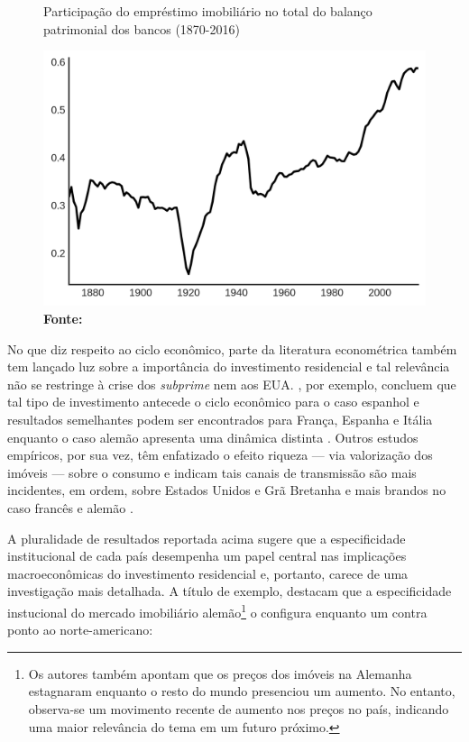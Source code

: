 \begin{figure}
	\centering
	\caption{Participação do empréstimo imobiliário no total do balanço patrimonial dos bancos (1870-2016)}
	\label{GraficoJorda}
	\includegraphics[width=.65\textwidth]{Jorda_Mean.png}
	\caption*{\textbf{Fonte:} \textcite[p.~10]{jorda_great_2014}}
\end{figure}



No que diz respeito ao ciclo econômico, parte da literatura econométrica também tem lançado luz sobre a importância do investimento residencial e tal relevância não se restringe à crise dos \textit{subprime} nem aos EUA. \textcite{alvarez_does_2010}, por exemplo, concluem que tal tipo de investimento antecede o ciclo econômico para o caso espanhol e resultados semelhantes podem ser encontrados para França, Espanha  e Itália enquanto o caso alemão apresenta uma dinâmica distinta \cites{ferrara_cyclical_2010}{ferrara_common_2010}. 
Outros estudos empíricos, por sua vez, têm enfatizado o efeito riqueza --- via valorização dos imóveis --- sobre o consumo e indicam tais canais de transmissão são mais incidentes, em ordem, sobre Estados Unidos e Grã Bretanha e mais brandos no caso francês e alemão \cites{sastre_assessment_2010}{chauvin_wealth_2010}{bassanetti_effects_2010}{arrondel_housing_2010}.


A pluralidade de resultados reportada acima sugere que a especificidade institucional de cada país desempenha um papel central nas implicações macroeconômicas do investimento residencial e, portanto, carece de uma investigação mais detalhada.
A título de exemplo, \textcite{wijburg_alternative_2017} destacam que a especificidade instucional do mercado imobiliário alemão\footnote{Os autores também apontam que os preços dos imóveis na Alemanha estagnaram enquanto o resto do mundo presenciou um aumento. No entanto, observa-se um movimento recente de aumento nos preços no país, indicando uma maior relevância do tema em um futuro próximo.} o configura enquanto um contra ponto ao norte-americano:

